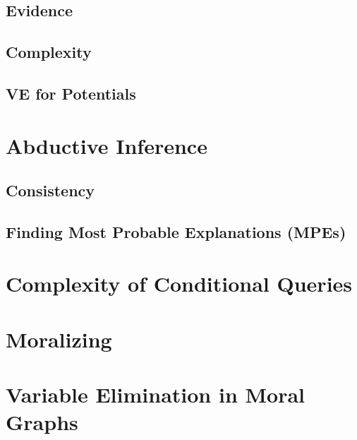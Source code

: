         \subsection{Evidence} %

        \subsection{Complexity} %

        \subsection{VE for Potentials} %

    \section{Abductive Inference} %

        \subsection{Consistency} %

        \subsection{Finding Most Probable Explanations (MPEs)} %

    \section{Complexity of Conditional Queries} %

    \section{Moralizing} %

    \section{Variable Elimination in Moral Graphs} %

